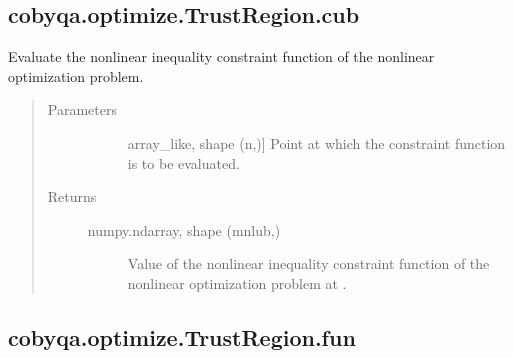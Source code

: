 \documentclass[letterpaper,10pt,english]{sphinxmanual}
\begin{document}
\begin{fulllineitems}
\begin{fulllineitems}
\end{fulllineitems}



\subsection{cobyqa.optimize.TrustRegion.cub}
\label{\detokenize{refs/generated/cobyqa.optimize.TrustRegion.cub:cobyqa-optimize-trustregion-cub}}\label{\detokenize{refs/generated/cobyqa.optimize.TrustRegion.cub::doc}}

\begin{fulllineitems}
\label{\detokenize{refs/generated/cobyqa.optimize.TrustRegion.cub:cobyqa.optimize.TrustRegion.cub}}
\sphinxAtStartPar
Evaluate the nonlinear inequality constraint function of the nonlinear
optimization problem.
\begin{quote}\begin{description}
\item[{Parameters}] \leavevmode\begin{description}
\item[{}] \leavevmode{[}array\_like, shape (n,){]}
\sphinxAtStartPar
Point at which the constraint function is to be evaluated.

\end{description}

\item[{Returns}] \leavevmode\begin{description}
\item[{numpy.ndarray, shape (mnlub,)}] \leavevmode
\sphinxAtStartPar
Value of the nonlinear inequality constraint function of the
nonlinear optimization problem at .

\end{description}

\end{description}\end{quote}

\end{fulllineitems}



\subsection{cobyqa.optimize.TrustRegion.fun}
\label{\detokenize{refs/generated/cobyqa.optimize.TrustRegion.fun:cobyqa-optimize-trustregion-fun}}\label{\detokenize{refs/generated/cobyqa.optimize.TrustRegion.fun::doc}}


\end{fulllineitems}
\end{document}
